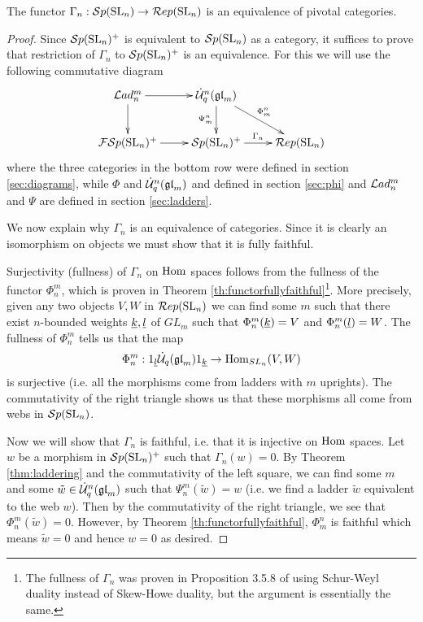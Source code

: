 \documentclass[10pt,leqno]{article}
\begin{document}
\begin{thm}\label{thm:main}
The functor $\Gamma_n: {\mathcal{S}p}({\rm{SL}}_n) \rightarrow \mathcal{R}ep({\rm{SL}}_n)$ is an equivalence of pivotal categories.
\end{thm}
\begin{proof}
Since ${\mathcal{S}p}({\rm{SL}}_n)^+ $ is equivalent to $ {\mathcal{S}p}({\rm{SL}}_n) $ as a category, it suffices to prove that restriction of $ \Gamma_n $ to $ {\mathcal{S}p}({\rm{SL}}_n)^+ $ is an equivalence. For this we will use the following commutative diagram
\begin{equation}\label{diag:main}
\xymatrix{
\Lad_n^m \ar[r] \ar[d] & \dU^n(\gl_m) \ar[dr]^{\Phi_m^n} \ar[d]_{\Psi_m^n} & \\
\FSp(\SL_n)^+ \ar[r] & \Sp(\SL_n)^+ \ar[r]^{\Gamma_n} & \Rep(\SL_n) \\
}
\end{equation}
where the three categories in the bottom row were defined in section \ref{sec:diagrams}, while
$\Phi$ and $\dot{{\mathcal{U}}}_q^n({\mathfrak{gl}}_m)$ and defined in section \ref{sec:phi} and $\mathcal{L}ad_n^m$ and $\Psi$ are defined in section \ref{sec:ladders}.

We now explain why $\Gamma_n$ is an equivalence of categories. Since it is clearly an isomorphism on objects we must show that it is fully faithful.

Surjectivity (fullness) of $\Gamma_n$ on $\operatorname{Hom}$ spaces follows from the fullness of the functor $ \Phi_n^m $, which is proven in Theorem \ref{th:functorfullyfaithful}\footnote{The fullness of $\Gamma_n$ was proven in Proposition 3.5.8 of \cite{0704.1503} using Schur-Weyl duality instead of Skew-Howe duality, but the argument is essentially the same.}.  More precisely, given any two objects $ V, W $ in $\mathcal{R}ep({\rm{SL}}_n) $ we can find some $m$ such that there exist $ n$-bounded weights $ {\underline{k}}, {\underline{l}} $ of $ GL_m$ such that $\Phi_n^m({\underline{k}}) = V$ and $\Phi_n^m({\underline{l}}) = W $. The fullness of $ \Phi_n^m $ tells us that the map
$$
\Phi_n^m : 1_{{\underline{l}}} \dot{{\mathcal{U}}}_q({\mathfrak{gl}}_m) 1_{{\underline{k}}} \rightarrow \operatorname{Hom}_{SL_n}(V, W)
$$
is surjective (i.e. all the morphisms come from ladders with $ m $ uprights).  The commutativity of the right triangle shows us that these morphisms all come from webs in $ {\mathcal{S}p}({\rm{SL}}_n) $.

Now we will show that $ \Gamma_n $ is faithful, i.e. that it is injective on $ \operatorname{Hom}$ spaces.  Let $w$ be a morphism in $ {\mathcal{S}p}({\rm{SL}}_n)^+ $ such that $\Gamma_n(w)=0$.  By Theorem \ref{thm:laddering} and the commutativity of the left square, we can find some $ m $ and some $\tilde{w} \in \dot{{\mathcal{U}}}_q^n({\mathfrak{gl}}_m) $ such that $ \Psi_n^m(\tilde{w}) = w $ (i.e. we find a ladder $ \tilde{w} $ equivalent to the web $ w $).  Then by the commutativity of the right triangle, we see that $ \Phi_n^m(\tilde{w}) = 0 $.  However, by Theorem \ref{th:functorfullyfaithful}, $\Phi_m^n$ is faithful which means $\tilde{w}=0$ and hence $w=0$ as desired.
\end{proof}
\end{document}
